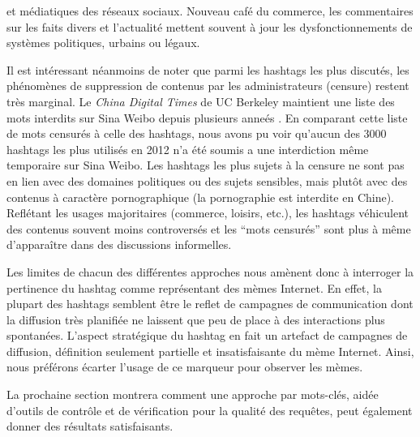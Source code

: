 et médiatiques des réseaux sociaux. Nouveau café du commerce, les commentaires sur les faits divers et l{\textquoteright}actualité mettent souvent à jour les dysfonctionnements de systèmes politiques, urbains ou légaux. 

Il est intéressant néanmoins de noter que parmi les hashtags les plus discutés, les phénomènes de suppression de contenus par les administrateurs (censure) restent très marginal. Le \textit{China Digital Times} de UC Berkeley maintient une liste des mots interdits sur Sina Weibo depuis plusieurs anneés \citep{Ng2013}. En comparant cette liste de mots censurés à celle des hashtags, nous avons pu voir qu{\textquoteright}aucun des 3000 hashtags les plus utilisés en 2012 n{\textquoteright}a été soumis a une interdiction m\^eme temporaire sur Sina Weibo. Les hashtags les plus sujets à la censure ne sont pas en lien avec des domaines politiques ou des sujets sensibles, mais plut\^ot avec des contenus à caractère pornographique (la pornographie est interdite en Chine). Reflétant les usages majoritaires (commerce, loisirs, etc.), les hashtags véhiculent des contenus souvent moins controversés et les {\textquotedblleft}mots censurés{\textquotedblright} sont plus à m\^eme d{\textquoteright}appara\^itre dans des discussions informelles.



\bigskip


Les limites de chacun des différentes approches nous amènent donc à interroger la pertinence du hashtag comme représentant des mèmes Internet. En effet, la plupart des hashtags semblent être le reflet de campagnes de communication dont la diffusion très planifiée ne laissent que peu de place à des interactions plus spontanées. L'aspect stratégique du hashtag en fait un artefact de campagnes de diffusion, définition seulement partielle et insatisfaisante du mème Internet.  Ainsi, nous préférons écarter l'usage de ce marqueur pour observer les mèmes.

La prochaine section montrera comment une approche par mots-clés, aidée d'outils de contrôle et de vérification pour la qualité des requêtes, peut également donner des résultats satisfaisants.